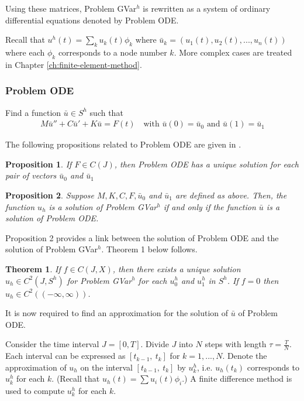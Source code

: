 \documentclass[../../main.tex]{subfiles}
\begin{document}
Using these matrices, Problem GVar$^h$ is rewritten as a system of ordinary
differential equations denoted by Problem ODE. 

Recall that $u^h(t) = \sum_{k} u_k(t)\phi_k$ where $\bar{u}_k = \left( u_1(t), u_2(t), ...  , u_n(t)\right)$ where each $\phi_k$ corresponds to a node number $k$. More complex cases are treated in Chapter \ref{ch:finite-element-method}.

\subsubsection*{Problem ODE}
Find a function $\bar{u} \in S^h$ such that \label{sym:baru}
\begin{eqnarray}
	M\bar{u}'' + C \bar{u}' + K\bar{u} = F(t) \ \ \ \textrm{ with } \bar{u}(0) = \bar{u}_0 \textrm{ and }  \bar{u}(1) = \bar{u}_1 \label{ODE}
\end{eqnarray}


The following propositions related to Problem ODE are given in \cite{BV13}.

\newtheorem{DC_Prop2}{Proposition}
\begin{DC_Prop2}
	If $F\in C(J)$, then Problem ODE has a unique solution for each pair of vectors $\bar{u}_0$ and $\bar{u}_1$
\end{DC_Prop2}

\newtheorem{DC_Prop3}[DC_Prop2]{Proposition}
\begin{DC_Prop3}
	Suppose $M, K, C, F,\bar{u}_0$ and $\bar{u}_1$ are defined as above. Then, the function $u_{h}$ is a solution of Problem GVar$^{h}$ if and only if the function $\bar{u}$ is a solution of Problem ODE.
\end{DC_Prop3}

Proposition 2 provides a link between the solution of Problem ODE and the
solution of Problem GVar$^h$. Theorem 1 below follows.

\newtheorem{DC_Thm2}{Theorem}
\begin{DC_Thm2} \label{DC_THM2}
	If $f \in C(J,X)$, then there exists a unique solution $u_h \in C^2(J, S^h)$ for Problem GVar$^h$ for each $u_0^h$ and $u_1^h$ in $S^h$. If $f = 0$ then $u_h \in C^2((-\infty, \infty))$.
\end{DC_Thm2}

It is now required to find an approximation for the solution of $\bar{u}$ of Problem ODE.

Consider the time interval $J = [0,T]$. Divide $J$ into $N$ steps with length $\tau = \frac{T}{N}$. Each interval can be expressed as $[t_{k-1}, \ t_k]$ for $k = 1,...,N$. Denote the approximation of $u_h$ on the interval $[t_{k-1}, \ t_k]$ by $u_k^h$, i.e. $u_h(t_k)$ corresponds to $u_k^h$ for each $k$. (Recall that $u_h(t) = \sum u_i(t)\phi_i$.) A finite difference method is used to compute $u^h_k$ for each $k$.
\end{document}
